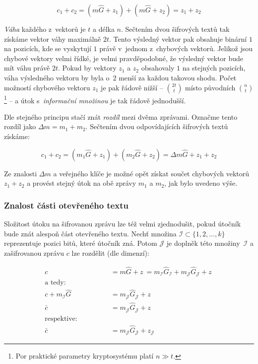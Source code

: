 \documentclass[thesis=M,czech,hidelinks]{FITthesis}[2012/06/26]
\newcommand{\0}{{\textcolor[gray]{0.80}{0}}}
\begin{document}
$$ c_1 + c_2 = (m\hat{G} + z_1) + (m\hat{G} + z_2) = z_1 + z_2 $$

\emph{Váha} každého z~vektorů je $t$ a délka $n$. Sečtením dvou šifrových textů
tak získáme vektor váhy maximálně $2t$. Tento výsledný vektor pak obsahuje
binární $1$ na pozicích, kde se vyskytují $1$ právě v~jednom z~chybových
vektorů. Jelikož jsou chybové vektory velmi řídké, je velmi pravděpodobné, že
výsledný vektor bude mít váhu právě $2t$. Pokud by vektory $z_1$ a $z_2$
obsahovaly $1$ na stejných pozicích, váha výsledného vektoru by byla o~$2$ menší
za každou takovou shodu. Počet možností chybového vektoru $z_1$ je pak řádově
nižší -- $\binom{2t}{t}$ místo původních $\binom{n}{t}$\footnote{
    Por praktické parametry kryptosystému platí $n \gg t$.
} -- a útok s~\emph{informační množinou} je tak řádově jednodušší.

Dle stejného principu stačí znát \emph{rozdíl} mezi dvěma zprávami. Označme
tento rozdíl jako $\Delta m = m_1 + m_2$. Sečtením dvou odpovídajících šifrových
textů získáme:

$$
    c_1 + c_2 = (m_1\hat{G} + z_1) + (m_2\hat{G} + z_2) =
    \Delta m \hat{G} + z_1 + z_2
$$

Ze znalosti $\Delta m$ a veřejného klíče je možné opět získat součet chybových
vektorů $z_1 + z_2 $ a provést stejný útok na obě zprávy $m_1$ a $m_2$, jak bylo
uvedeno výše.


\subsubsection{Znalost části otevřeného textu}

Složitost útoku na šifrovanou zprávu lze též velmi zjednodušit, pokud útočník
bude znát alespoň část otevřeného textu. Nechť množina $\mathcal{I} \subset
\{1,2,\ldots,k\}$ reprezentuje pozici bitů, které útočník zná. Potom
$\mathcal{J}$ je doplněk této množiny~$\mathcal{I}$ a zašifrovanou zprávu $c$
lze rozdělit (dle dimenzí):

\begin{align*}
    c &= m\hat{G} + z~=
    m_{\mathcal{I}}\hat{G}_{\mathcal{I}} + m_{\mathcal{J}}\hat{G}_{\mathcal{J}} + z~\\
    \text{a tedy:} \qquad \qquad \\
    c + m_{\mathcal{I}}\hat{G} &= m_{\mathcal{J}}\hat{G}_{\mathcal{J}} + z~\\
                       \bar{c} &= m_{\mathcal{J}}\hat{G}_{\mathcal{J}} + z~\\
    \text{respektive:} \qquad \qquad \\
                       \bar{c} &= m_{\mathcal{J}}\hat{G}_{\mathcal{J}} + z_{\mathcal{J}}
\end{align*}
\end{document}

